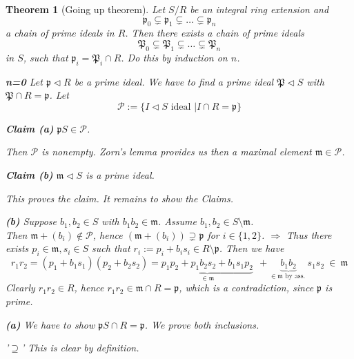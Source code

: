 \documentclass[11pt]{book}
\newtheorem{theorem}{Theorem}[section]
\theoremstyle{nonumberbreak}
\newenvironment{pr}[1][]{\ifthenelse{\equal{#1}{}}{\proof}{\proof[#1]}\rm}{\endproof}
\begin{document}
\begin{spacing}{1.3}
\begin{theorem}[Going up theorem]
Let $S/R$ be an integral ring extension and
$$\mathfrak{p}_0 \subsetneq \mathfrak{p}_1 \subsetneq \ldots \subsetneq \mathfrak{p}_n$$
a chain of prime ideals in $R$. Then there exists a chain of prime ideals
$$\mathfrak{P}_0 \subsetneq \mathfrak{P}_1 \subsetneq \ldots \subsetneq \mathfrak{P}_n$$
in $S$, such that $\mathfrak{p}_i = \mathfrak{P}_i \cap R$.
\begin{pr}
Do this by induction on $n$. 
\begin{compactitem}
\item[\textbf{n=0}] Let $\mathfrak{p} \triangleleft R$ be a prime ideal. We have to find a prime ideal $\mathfrak{P} \triangleleft S$ with $\mathfrak{P} \cap R=\mathfrak{p}$. Let
$$\mathcal{P}:= \{I \triangleleft S \textrm{ ideal } \big \vert I \cap R = \mathfrak{p} \}$$
\begin{compactenum}
\item[\textbf{Claim (a)}] $\mathfrak{p}S \in \mathcal{P}$.
\end{compactenum}
Then $\mathcal{P}$ is nonempty. Zorn's lemma provides us then a maximal element $\mathfrak{m} \in \mathcal{P}$.
\begin{compactenum}
\item[\textbf{Claim (b)}] $\mathfrak{m} \triangleleft S$ is a prime ideal.
\end{compactenum}
This proves the claim. It remains to show the Claims.
\begin{compactenum}
\item[\textbf{(b)}] Suppose $b_1, b_2 \in S$ with $b_1b_2 \in \mathfrak{m}$. Assume $b_1, b_2 \in S\setminus \mathfrak{m}$.\\
Then $\mathfrak{m}+( b_i ) \notin \mathcal{P}$, hence $\left(\mathfrak{m}+( b_i ) \right) \supsetneq \mathfrak{p}$ for $i \in \{1,2\}$.
$\Longrightarrow$ Thus there exists $p_i \in \mathfrak{m}, s_i \in S$ such that $r_i:=p_i+b_is_i \in R\setminus \mathfrak{p}$.  Then we have
$$r_1r_2=(p_1+b_1s_1)(p_2+b_2s_2)=\underbrace{p_1p_2+p_1b_2s_2+b_1s_1p_2}_{\in \mathfrak{m}}\ \ +\underbrace{b_1b_2}_{\in \mathfrak{m} \textrm{ by ass. }}s_1s_2\ \in \ \mathfrak{m}$$
Clearly $r_1r_2 \in R$, hence $r_1r_2 \in \mathfrak{m} \cap R = \mathfrak{p}$, which is a contradiction, since $\mathfrak{p}$ is prime.
\item[\textbf{(a)}] We have to show $\mathfrak{p}S \cap R = \mathfrak{p}$. We prove both inclusions.
\begin{compactitem}
\item['$\supseteq$'] This is clear by definition.

\end{compactitem}
\end{compactenum}
\end{compactitem}
\end{pr}
\end{theorem}
\end{spacing}
\end{document}
